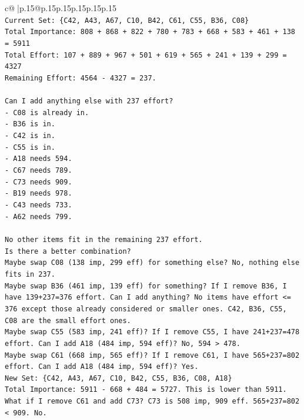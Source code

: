 \documentclass{article}
\begin{document}
{\begin{supertabular}{c@{$\;$}|p{.15\linewidth}@{}p{.15\linewidth}p{.15\linewidth}p{.15\linewidth}p{.15\linewidth}p{.15\linewidth}}
{{{\\ 
\texttt{Current Set: \{C42, A43, A67, C10, B42, C61, C55, B36, C08\}} \\
\texttt{Total Importance: 808 + 868 + 822 + 780 + 783 + 668 + 583 + 461 + 138 = 5911} \\
\texttt{Total Effort: 107 + 889 + 967 + 501 + 619 + 565 + 241 + 139 + 299 = 4327} \\
\texttt{Remaining Effort: 4564 {-} 4327 = 237.} \\
\\ 
\texttt{Can I add anything else with 237 effort?} \\
\texttt{{-} C08 is already in.} \\
\texttt{{-} B36 is in.} \\
\texttt{{-} C42 is in.} \\
\texttt{{-} C55 is in.} \\
\texttt{{-} A18 needs 594.} \\
\texttt{{-} C67 needs 789.} \\
\texttt{{-} C73 needs 909.} \\
\texttt{{-} B19 needs 978.} \\
\texttt{{-} C43 needs 733.} \\
\texttt{{-} A62 needs 799.} \\
\\ 
\texttt{No other items fit in the remaining 237 effort.} \\
\texttt{Is there a better combination?} \\
\texttt{Maybe swap C08 (138 imp, 299 eff) for something else? No, nothing else fits in 237.} \\
\texttt{Maybe swap B36 (461 imp, 139 eff) for something? If I remove B36, I have 139+237=376 effort. Can I add anything? No items have effort <= 376 except those already considered or smaller ones. C42, B36, C55, C08 are the small effort ones.} \\
\texttt{Maybe swap C55 (583 imp, 241 eff)? If I remove C55, I have 241+237=478 effort. Can I add A18 (484 imp, 594 eff)? No, 594 > 478.} \\
\texttt{Maybe swap C61 (668 imp, 565 eff)? If I remove C61, I have 565+237=802 effort. Can I add A18 (484 imp, 594 eff)? Yes.} \\
\texttt{New Set: \{C42, A43, A67, C10, B42, C55, B36, C08, A18\}} \\
\texttt{Total Importance: 5911 {-} 668 + 484 = 5727. This is lower than 5911.} \\
\texttt{What if I remove C61 and add C73? C73 is 508 imp, 909 eff. 565+237=802 < 909. No.} \\
}}}
\end{supertabular}}
\end{document}
